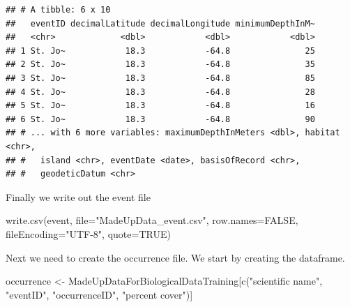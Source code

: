 \documentclass[
]{book}
\newenvironment{Shaded}{\begin{snugshade}}{\end{snugshade}}
\newcommand{\AttributeTok}[1]{\textcolor[rgb]{0.77,0.63,0.00}{#1}}
\newcommand{\ConstantTok}[1]{\textcolor[rgb]{0.00,0.00,0.00}{#1}}
\newcommand{\DecValTok}[1]{\textcolor[rgb]{0.00,0.00,0.81}{#1}}
\newcommand{\FunctionTok}[1]{\textcolor[rgb]{0.00,0.00,0.00}{#1}}
\newcommand{\NormalTok}[1]{#1}
\newcommand{\OtherTok}[1]{\textcolor[rgb]{0.56,0.35,0.01}{#1}}
\newcommand{\SpecialCharTok}[1]{\textcolor[rgb]{0.00,0.00,0.00}{#1}}
\newcommand{\StringTok}[1]{\textcolor[rgb]{0.31,0.60,0.02}{#1}}
\begin{document}
\begin{Shaded}
\end{Shaded}

\begin{verbatim}
## # A tibble: 6 x 10
##   eventID decimalLatitude decimalLongitude minimumDepthInM~
##   <chr>             <dbl>            <dbl>            <dbl>
## 1 St. Jo~            18.3            -64.8               25
## 2 St. Jo~            18.3            -64.8               35
## 3 St. Jo~            18.3            -64.8               85
## 4 St. Jo~            18.3            -64.8               28
## 5 St. Jo~            18.3            -64.8               16
## 6 St. Jo~            18.3            -64.8               90
## # ... with 6 more variables: maximumDepthInMeters <dbl>, habitat <chr>,
## #   island <chr>, eventDate <date>, basisOfRecord <chr>,
## #   geodeticDatum <chr>
\end{verbatim}

Finally we write out the event file

\begin{Shaded}
\begin{Highlighting}[]
\FunctionTok{write.csv}\NormalTok{(event, }\AttributeTok{file=}\StringTok{"MadeUpData\_event.csv"}\NormalTok{, }\AttributeTok{row.names=}\ConstantTok{FALSE}\NormalTok{, }\AttributeTok{fileEncoding=}\StringTok{"UTF{-}8"}\NormalTok{, }\AttributeTok{quote=}\ConstantTok{TRUE}\NormalTok{)}
\end{Highlighting}
\end{Shaded}

Next we need to create the occurrence file. We start by creating the dataframe.

\begin{Shaded}
\begin{Highlighting}[]
\NormalTok{occurrence }\OtherTok{\textless{}{-}}\NormalTok{ MadeUpDataForBiologicalDataTraining[}\FunctionTok{c}\NormalTok{(}\StringTok{"scientific name"}\NormalTok{, }\StringTok{"eventID"}\NormalTok{, }\StringTok{"occurrenceID"}\NormalTok{, }\StringTok{"percent cover"}\NormalTok{)] }
\end{Highlighting}
\end{Shaded}
\end{document}
